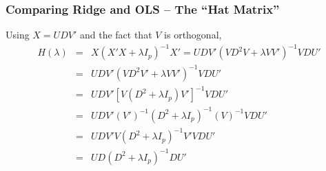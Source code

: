 \begin{frame}
  \frametitle{Comparing Ridge and OLS -- The ``Hat Matrix''}

    Using $X =UDV'$ and the fact that $V$ is orthogonal, 
    \begin{eqnarray*}
      H(\lambda) &=&  X\left( X'X + \lambda I_p \right)^{-1}X' = UDV'\left( VD^2V + \lambda VV' \right)^{-1}VDU'\\
      &=& UDV'\left( VD^2V' + \lambda VV' \right)^{-1}VDU'\\
      &=& UDV'\left[ V(D^2 + \lambda I_p)V' \right]^{-1}VDU'\\
      &=& UDV'\left( V' \right)^{-1}\left( D^2 + \lambda I_p \right)^{-1}\left( V \right)^{-1}VDU'\\
      &=& UDV'V\left( D^2 + \lambda I_p \right)^{-1}V'VDU'\\
      &=& UD\left( D^2 + \lambda I_p \right)^{-1}DU'
    \end{eqnarray*}



\end{frame}
